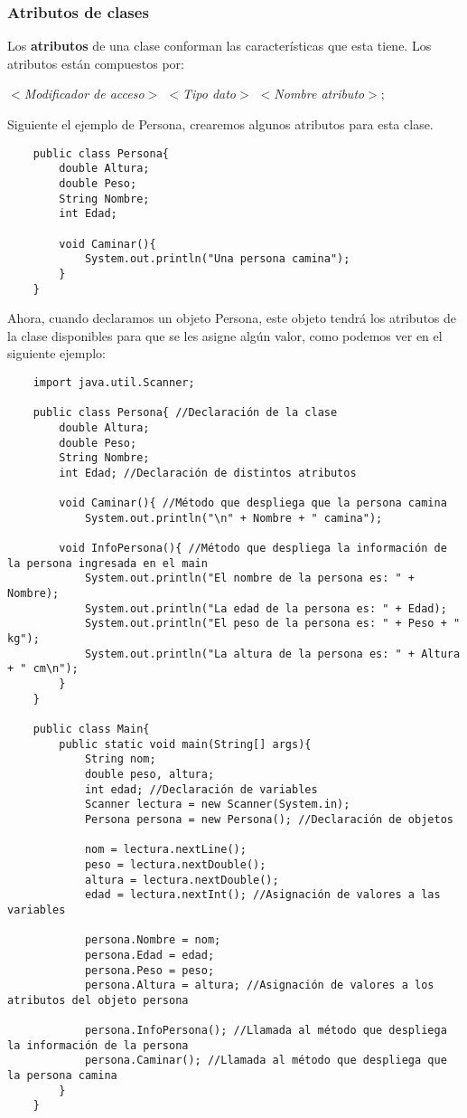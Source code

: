 \subsubsection{Atributos de clases}
Los \textbf{atributos} de una clase conforman las características que esta tiene. Los atributos están compuestos por:\begin{center}\textit{$<$Modificador de acceso$>$ $<$Tipo dato$>$ $<$Nombre atributo$>;$}\end{center}
Siguiente el ejemplo de Persona, crearemos algunos atributos para esta clase.
\begin{lstlisting}
    public class Persona{
        double Altura;
        double Peso;
        String Nombre;
        int Edad;
    
        void Caminar(){
            System.out.println("Una persona camina");
        }
    }
\end{lstlisting}
Ahora, cuando declaramos un objeto Persona, este objeto tendrá los atributos de la clase disponibles para que se les asigne algún valor, como podemos ver en el siguiente ejemplo:
\begin{lstlisting}
    import java.util.Scanner;
    
    public class Persona{ //Declaración de la clase
        double Altura;
        double Peso;
        String Nombre;
        int Edad; //Declaración de distintos atributos
    
        void Caminar(){ //Método que despliega que la persona camina 
            System.out.println("\n" + Nombre + " camina");
        
        void InfoPersona(){ //Método que despliega la información de la persona ingresada en el main
            System.out.println("El nombre de la persona es: " + Nombre);
            System.out.println("La edad de la persona es: " + Edad);
            System.out.println("El peso de la persona es: " + Peso + " kg");
            System.out.println("La altura de la persona es: " + Altura + " cm\n");
        }
    }
    
    public class Main{
        public static void main(String[] args){
            String nom;
            double peso, altura;
            int edad; //Declaración de variables
            Scanner lectura = new Scanner(System.in);
            Persona persona = new Persona(); //Declaración de objetos
            
            nom = lectura.nextLine();
            peso = lectura.nextDouble();
            altura = lectura.nextDouble();
            edad = lectura.nextInt(); //Asignación de valores a las variables
            
            persona.Nombre = nom;
            persona.Edad = edad;
            persona.Peso = peso;
            persona.Altura = altura; //Asignación de valores a los atributos del objeto persona
            
            persona.InfoPersona(); //Llamada al método que despliega la información de la persona
            persona.Caminar(); //Llamada al método que despliega que la persona camina
        }
    }
\end{lstlisting}

